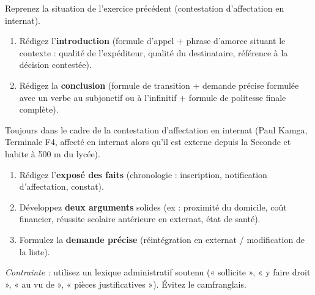 \documentclass[11pt]{article}
\begin{document}
\begin{exercice}
Reprenez la situation de l'exercice précédent (contestation d'affectation en internat).
\begin{enumerate}
    \item Rédigez l'\textbf{introduction} (formule d'appel + phrase d'amorce situant le contexte : qualité de l'expéditeur, qualité du destinataire, référence à la décision contestée).
    \item Rédigez la \textbf{conclusion} (formule de transition + demande précise formulée avec un verbe au subjonctif ou à l'infinitif + formule de politesse finale complète).
\end{enumerate}
\end{exercice}

\begin{exercice}
Toujours dans le cadre de la contestation d'affectation en internat (Paul Kamga, Terminale F4, affecté en internat alors qu'il est externe depuis la Seconde et habite à 500 m du lycée).
\begin{enumerate}
    \item Rédigez l'\textbf{exposé des faits} (chronologie : inscription, notification d'affectation, constat).
    \item Développez \textbf{deux arguments} solides (ex : proximité du domicile, coût financier, réussite scolaire antérieure en externat, état de santé).
    \item Formulez la \textbf{demande précise} (réintégration en externat / modification de la liste).
\end{enumerate}
\emph{Contrainte :} utilisez un lexique administratif soutenu (« sollicite », « y faire droit », « au vu de », « pièces justificatives »). Évitez le camfranglais.
\end{exercice}
\end{document}
